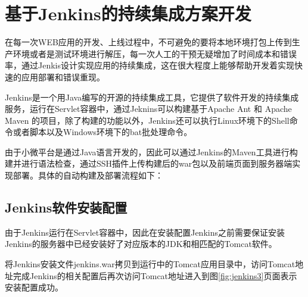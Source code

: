 \section{基于Jenkins的持续集成方案开发}

在每一次WEB应用的开发、上线过程中，不可避免的要将本地环境打包上传到生产环境或者是测试环境进行解压，每一次人工的干预无疑增加了时间成本和错误率，通过Jenkis设计实现应用的持续集成，这在很大程度上能够帮助开发着实现快速的应用部署和错误重现\cite{高珺2015以持续集成方式进行系统自动化部署}。

Jenkins是一个用Java编写的开源的持续集成工具，它提供了软件开发的持续集成服务，运行在Servlet容器中，通过Jeknins可以构建基于Apache Ant 和 Apache Maven 的项目，除了构建的功能以外，Jenkins还可以执行Linux环境下的Shell命令或者脚本以及Windows环境下的bat批处理命令\cite{王宁2014基于}。

由于小微平台是通过Java语言开发的，因此可以通过Jenkins的Maven工具进行构建并进行语法检查，通过SSH插件上传构建后的war包以及前端页面到服务器端实现部署\cite{赵亚楠2013基于}。具体的自动构建及部署流程如下：

\subsection{Jenkins软件安装配置}

由于Jenkins运行在Servlet容器中，因此在安装配置Jenkins之前需要保证安装Jenkins的服务器中已经安装好了对应版本的JDK和相匹配的Tomcat软件\cite{赵杰昌2014基于}。

将Jenkins安装文件jenkins.war拷贝到运行中的Tomcat应用目录中，访问Tomcat地址完成Jenkins的相关配置后再次访问Tomcat地址进入到图\ref{fig:jenkins3}页面表示安装配置成功。


